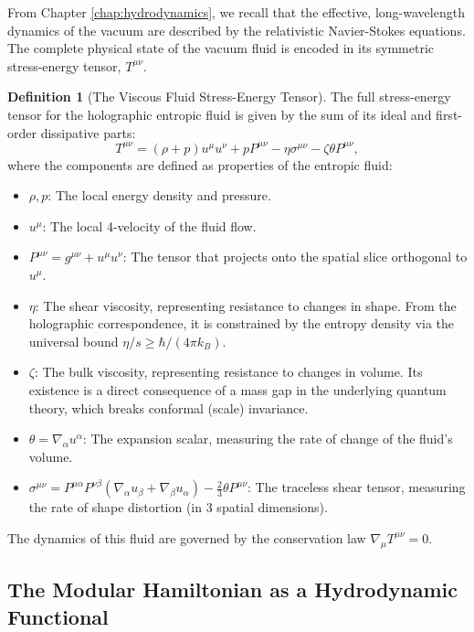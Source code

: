 \documentclass[11pt, letterpaper]{report}
\theoremstyle{plain} %
\theoremstyle{definition} %
\newtheorem{definition}{Definition}[chapter]
\theoremstyle{remark} %
\begin{document}
From Chapter \ref{chap:hydrodynamics}, we recall that the effective, long-wavelength dynamics of the vacuum are described by the relativistic Navier-Stokes equations. The complete physical state of the vacuum fluid is encoded in its symmetric stress-energy tensor, $T^{\mu\nu}$.

\begin{definition}[The Viscous Fluid Stress-Energy Tensor]
\label{def:viscous_stress_tensor}
The full stress-energy tensor for the holographic entropic fluid is given by the sum of its ideal and first-order dissipative parts:
\begin{equation}
    T^{\mu\nu} = (\rho+p)u^\mu u^\nu + p P^{\mu\nu} -\eta\sigma^{\mu\nu} - \zeta\theta P^{\mu\nu},
\end{equation}
where the components are defined as properties of the entropic fluid:
\begin{itemize}
    \item $\rho, p$: The local energy density and pressure.
    \item $u^\mu$: The local 4-velocity of the fluid flow.
    \item $P^{\mu\nu} = g^{\mu\nu} + u^\mu u^\nu$: The tensor that projects onto the spatial slice orthogonal to $u^\mu$.
    \item $\eta$: The shear viscosity, representing resistance to changes in shape. From the holographic correspondence, it is constrained by the entropy density via the universal bound $\eta/s \ge \hbar/(4\pi k_B)$.
    \item $\zeta$: The bulk viscosity, representing resistance to changes in volume. Its existence is a direct consequence of a mass gap in the underlying quantum theory, which breaks conformal (scale) invariance.
    \item $\theta = \nabla_\alpha u^\alpha$: The expansion scalar, measuring the rate of change of the fluid's volume.
    \item $\sigma^{\mu\nu} = P^{\mu\alpha}P^{\nu\beta}\left(\nabla_\alpha u_\beta + \nabla_\beta u_\alpha\right) - \frac{2}{3}\theta P^{\mu\nu}$: The traceless shear tensor, measuring the rate of shape distortion (in 3 spatial dimensions).
\end{itemize}
The dynamics of this fluid are governed by the conservation law $\nabla_\mu T^{\mu\nu} = 0$.
\end{definition}

\subsection{The Modular Hamiltonian as a Hydrodynamic Functional}
\label{subsec:modular_hydro_functional}
\end{document}
